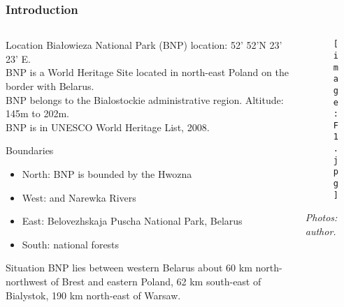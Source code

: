 \documentclass[pdflatex,compress,8pt,
	xcolor={dvipsnames,dvipsnames,svgnames,x11names,table},
	hyperref={colorlinks = true,
	breaklinks = true, urlcolor = NavyBlue, breaklinks = true}]{beamer}
\begin{document}
\begin{frame}\frametitle{Introduction}
\begin{minipage}[0.4\textheight]{\textwidth}
\begin{columns}[T]
\begin{column}{0.6\textwidth}

\vspace{4em}
\begin{alertblock}{Location}
Białowieza National Park (BNP) location: 52' 52'N 23' 23' E. \\
BNP is a World Heritage Site located in north-east Poland on the border with Belarus.\\
BNP belongs to the Bialostockie administrative region. Altitude: 145m to 202m.\\
BNP is in UNESCO World Heritage List, 2008. 
\end{alertblock}

\begin{block}{Boundaries}
\begin{itemize}
	\item North: BNP is bounded by the Hwozna
	\item West: and Narewka Rivers
	\item East: Belovezhskaja Puscha National Park, Belarus
	\item South: national forests
\end{itemize} 
\end{block}

\begin{examples}{Situation}
 BNP lies between western Belarus about 60 km north-northwest of Brest and eastern Poland, 62 km south-east of Bialystok, 190 km north-east of Warsaw.
\end{examples}   

\end{column}
\begin{column}{0.4\textwidth}
\vspace{5em}
\begin{figure}[H]
	\centering
		\texttt{[image: F1.jpg]}
\end{figure}
\emph{Photos: author.}
\end{column}
\end{columns}
\end{minipage}
\end{frame}
\end{document}
